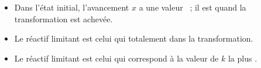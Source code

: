 \begin{itemize}
    \item Dans l'état initial, l'avancement $x$ a une valeur \dotline{3cm}~; il
          est \dotline{3cm} quand la transformation est achevée.
    \item Le réactif limitant est celui qui \dotline{3cm} totalement dans la
          transformation.
    \item Le réactif limitant est celui qui correspond à la valeur de $k$ la
          plus \dotline{3cm}.
\end{itemize}


